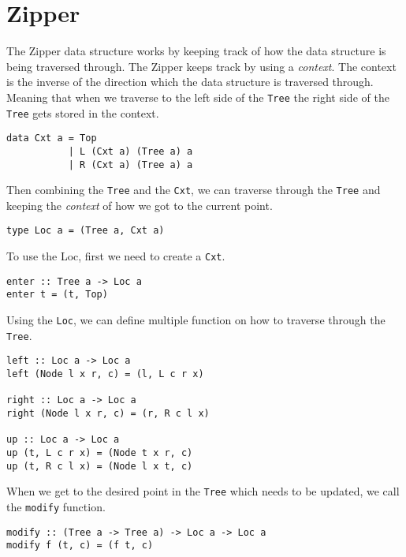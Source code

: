 \newpage
\section{Zipper}


The Zipper data structure works by keeping track of how the data structure is being traversed through. The Zipper keeps track by using a \textit{context}. The context is the inverse of the direction which the data structure is traversed through. Meaning that when we traverse to the left side of the \texttt{Tree} the right side of the \texttt{Tree} gets stored in the context. 

\begin{verbatim}
data Cxt a = Top
           | L (Cxt a) (Tree a) a
           | R (Cxt a) (Tree a) a
\end{verbatim}

Then combining the \texttt{Tree} and the \texttt{Cxt}, we can traverse through the \texttt{Tree} and keeping the \textit{context} of how we got to the current point.

\begin{verbatim}
type Loc a = (Tree a, Cxt a)
\end{verbatim}

To use the Loc, first we need to create a \texttt{Cxt}.

\begin{verbatim}
enter :: Tree a -> Loc a
enter t = (t, Top)
\end{verbatim}

Using the \texttt{Loc}, we can define multiple function on how to traverse through the \texttt{Tree}.

\begin{verbatim}
left :: Loc a -> Loc a
left (Node l x r, c) = (l, L c r x)

right :: Loc a -> Loc a
right (Node l x r, c) = (r, R c l x)

up :: Loc a -> Loc a
up (t, L c r x) = (Node t x r, c)
up (t, R c l x) = (Node l x t, c)
\end{verbatim}

When we get to the desired point in the \texttt{Tree} which needs to be updated, we call the \texttt{modify} function.

\begin{verbatim}
modify :: (Tree a -> Tree a) -> Loc a -> Loc a
modify f (t, c) = (f t, c)
\end{verbatim}

